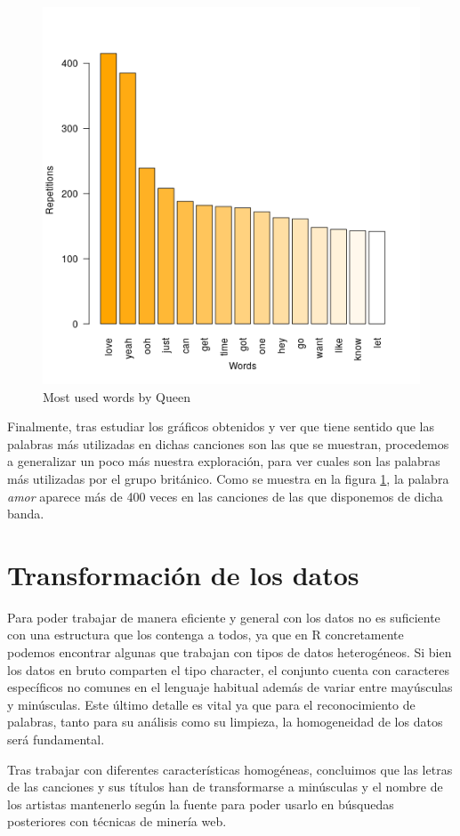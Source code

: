 \begin{figure}[h]
	\centering
	\includegraphics[width=0.7\linewidth]{Imagenes/queen_most_used_words}
	\caption{Most used words by Queen}
	\label{fig:queen_songs}
\end{figure}


Finalmente, tras estudiar los gráficos obtenidos y ver que tiene sentido que las palabras más utilizadas en dichas canciones son las que se muestran, procedemos a generalizar un poco más nuestra exploración, para ver cuales son las palabras más utilizadas por el grupo británico. Como se muestra en la figura \ref{fig:queen_songs}, la palabra \textit{amor} aparece más de 400 veces en las canciones de las que disponemos de dicha banda.


\section{Transformación de los datos}
Para poder trabajar de manera eficiente y general con los datos no es suficiente con una estructura que los contenga a todos, ya que en R concretamente podemos encontrar algunas que trabajan con tipos de datos heterogéneos. Si bien los datos en bruto comparten el tipo character, el conjunto cuenta con caracteres específicos no comunes en el lenguaje habitual además de variar entre mayúsculas y minúsculas. Este último detalle es vital ya que para el reconocimiento de palabras, tanto para su análisis como su limpieza, la homogeneidad de los datos será fundamental.

Tras trabajar con diferentes características homogéneas, concluimos que las letras de las canciones y sus títulos han de transformarse a minúsculas y el nombre de los artistas mantenerlo según la fuente para poder usarlo en búsquedas posteriores con técnicas de minería web.




